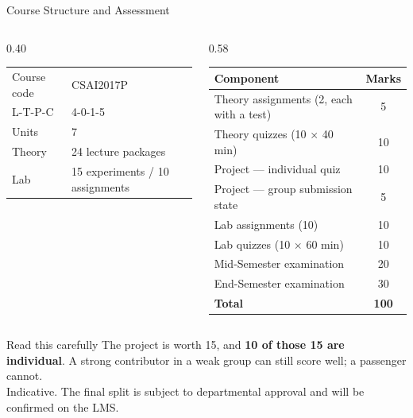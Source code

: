 \documentclass[aspectratio=169]{beamer}
\begin{document}
\begin{frame}[shrink=12]{Course Structure and Assessment}
  \begin{columns}[T]
    \begin{column}{0.40\textwidth}
      \footnotesize
      \begin{tabular}{@{}ll@{}}
        \toprule
        Course code & CSAI2017P \\
        L-T-P-C & 4-0-1-5 \\
        Units & 7 \\
        Theory & 24 lecture packages \\
        Lab & 15 experiments / 10 assignments \\
        \bottomrule
      \end{tabular}
    \end{column}
    \begin{column}{0.58\textwidth}
      \footnotesize
      \begin{tabular}{@{}lc@{}}
        \toprule
        \textbf{Component} & \textbf{Marks} \\
        \midrule
        Theory assignments (2, each with a test) & 5 \\
        Theory quizzes (10 $\times$ 40 min) & 10 \\
        Project --- individual quiz & 10 \\
        Project --- group submission state & 5 \\
        Lab assignments (10) & 10 \\
        Lab quizzes (10 $\times$ 60 min) & 10 \\
        Mid-Semester examination & 20 \\
        End-Semester examination & 30 \\
        \midrule
        \textbf{Total} & \textbf{100} \\
        \bottomrule
      \end{tabular}
    \end{column}
  \end{columns}
  \vspace{0.3em}
  \begin{block}{Read this carefully}
    The project is worth 15, and \textbf{10 of those 15 are individual}. A strong
    contributor in a weak group can still score well; a passenger cannot.\\[2pt]
    {\footnotesize Indicative. The final split is subject to departmental approval and will be confirmed on the LMS.}
  \end{block}
\end{frame}
\end{document}
